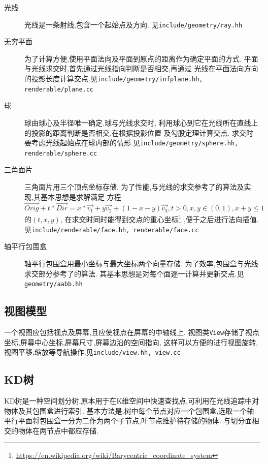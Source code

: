 \begin{description}
  \item[光线]光线是一条射线,包含一个起始点及方向. 见\verb|include/geometry/ray.hh|
  \item[无穷平面]
    为了计算方便,使用平面法向及平面到原点的距离作为确定平面的方式.
    平面与光线求交时,首先通过光线指向判断是否相交,再通过
    光线在平面法向方向的投影长度计算交点.见\verb|include/geometry/infplane.hh, renderable/plane.cc|

  \item[球]球由球心及半径唯一确定.球与光线求交时,
    利用球心到它在光线所在直线上的投影的距离判断是否相交,在根据投影位置
    及勾股定理计算交点. 求交时要考虑光线起始点在球内部的情形.见\verb|include/geometry/sphere.hh, renderable/sphere.cc|

  \item[三角面片]三角面片用三个顶点坐标存储.
    为了性能,与光线的求交参考了\cite{triangle, triangle_code}的算法及实现,其基本思想是求解满足
    方程
    \[  \overrightarrow{Orig} + t * \overrightarrow{Dir} = x * \overrightarrow{v_1} + y  \overrightarrow{v_2} + (1 - x -
    y)\overrightarrow{v_3}, t > 0, x, y \in (0, 1), x + y \le 1\]
    的$ (t, x, y)$, 在求交时同时能得到交点的重心坐标\footnote{\url{https://en.wikipedia.org/wiki/Barycentric\_coordinate\_system}}
    ,便于之后进行法向插值.见\verb|include/renderable/face.hh, renderable/face.cc|

  \item[轴平行包围盒]
    轴平行包围盒用最小坐标与最大坐标两个向量存储.
    为了效率,包围盒与光线求交部分参考了\cite{aabb}的算法.
    其基本思想是对每个面逐一计算并更新交点.见\verb|geometry/aabb.hh|
\end{description}

\subsection{视图模型}
一个视图应包括视点及屏幕,且应使视点在屏幕的中轴线上.
视图类\verb|View|存储了视点坐标,屏幕中心坐标,屏幕尺寸,屏幕边沿的空间指向,
这样可以方便的进行视图旋转,视图平移,缩放等导航操作.见\verb|include/view.hh, view.cc|

\subsection{KD树}
KD树是一种空间划分树,原本用于在K维空间中快速查找点,可利用在光线追踪中对物体及其包围盒进行索引.
基本方法是,树中每个节点对应一个包围盒,选取一个轴平行平面将包围盒一分为二作为两个子节点,叶节点维护待存储的物体.
与切分面相交的物体在两节点中都应存储.

